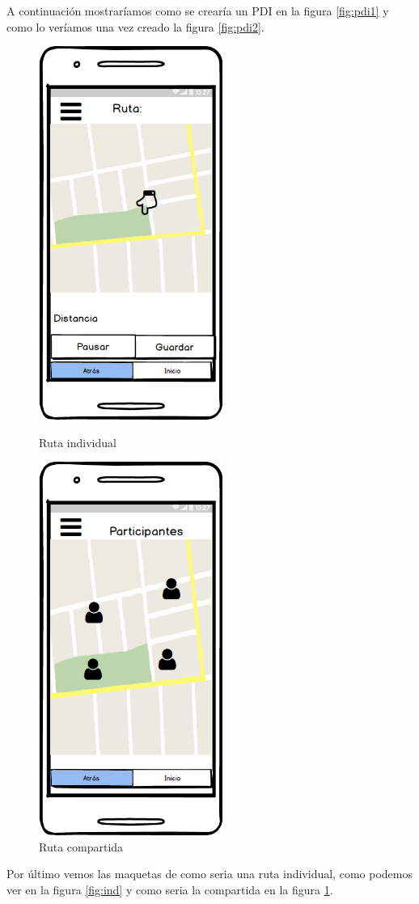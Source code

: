  A continuación mostraríamos como se crearía un PDI en la figura  \ref{fig:pdi1} y como lo veríamos una vez creado la figura \ref{fig:pdi2}.	

	\begin{figure}[H]
\begin{minipage}[b]{0.5\linewidth} %
\centering
\includegraphics[width=6cm]{maqueta/Trayecto-actual.png}

\caption{Ruta individual}
\label{fig:ind}
\end{minipage}
\hspace{0.5cm} %
\begin{minipage}[b]{0.5\linewidth}
\centering
\includegraphics[width=6cm]{maqueta/Trayecto-actual-compartido.png}

\caption{Ruta compartida}
\label{fig:comp}
\end{minipage}
\end{figure}

Por último vemos las maquetas de como seria una ruta individual, como podemos ver en la figura \ref{fig:ind} y como seria la compartida en la figura \ref{fig:comp}.